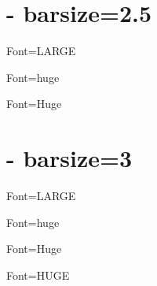 \documentclass[12pt]{article}
\begin{document}
\section{- barsize=2.5}
\def\barsize{2.5}%

\def\chordFontSize{\LARGE\bfseries}
\begin{chordbar}{4}{Font=LARGE}
\end{chordbar}

\def\chordFontSize{\huge\bfseries}
\begin{chordbar}{4}{Font=huge}
\end{chordbar}


\def\chordFontSize{\Huge\bfseries}
\begin{chordbar}{4}{Font=Huge}
\end{chordbar}

\section{- barsize=3}
\def\barsize{3}%

\def\chordFontSize{\LARGE\bfseries}
\begin{chordbar}{4}{Font=LARGE}
\end{chordbar}

\def\chordFontSize{\huge\bfseries}
\begin{chordbar}{4}{Font=huge}
\end{chordbar}


\def\chordFontSize{\Huge\bfseries}
\begin{chordbar}{4}{Font=Huge}
\end{chordbar}

\def\chordFontSize{\HUGE\bfseries}
\begin{chordbar}{4}{Font=HUGE}
\end{chordbar}
\end{document}
